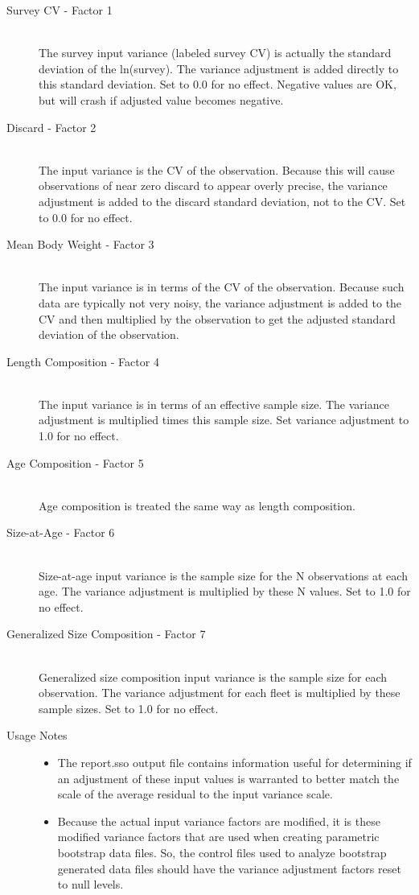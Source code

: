 \begin{description}
	\item[Survey CV - Factor 1]\hfil\\
	The survey input variance (labeled survey CV) is actually the standard deviation of the ln(survey).  The variance adjustment is added directly to this standard deviation.  Set to 0.0 for no effect.  Negative values are OK, but will crash if adjusted value becomes negative.
	\item[Discard - Factor 2]\hfil\\
	The input variance is the CV of the observation.  Because this will cause observations of near zero discard to appear overly precise, the variance adjustment is added to the discard standard deviation, not to the CV.  Set to 0.0 for no effect.
	\item[Mean Body Weight - Factor 3]\hfil\\
	The input variance is in terms of the CV of the observation.  Because such data are typically not very noisy, the variance adjustment is added to the CV and then multiplied by the observation to get the adjusted standard deviation of the observation.
	\item[Length Composition - Factor 4]\hfil\\
	The input variance is in terms of an effective sample size.  The variance adjustment is multiplied times this sample size.  Set variance adjustment to 1.0 for no effect.
	\item[Age Composition - Factor 5]\hfill\\
	Age composition is treated the same way as length composition.
	\item[Size-at-Age - Factor 6]\hfill\\
	Size-at-age input variance is the sample size for the N observations at each age.  The variance adjustment is multiplied by these N values. Set to 1.0 for no effect.
	\item[Generalized Size Composition - Factor 7]\hfill\\
	Generalized size composition input variance is the sample size for each observation.  The variance adjustment for each fleet is multiplied by these sample sizes. Set to 1.0 for no effect.
	\item[Usage Notes]\hfill
	\begin{itemize}
		\item The report.sso output file contains information useful for determining if an adjustment of these input values is warranted to better match the scale of the average residual to the input variance scale.
		\item Because the actual input variance factors are modified, it is these modified variance factors that are used when creating parametric bootstrap data files.  So, the control files used to analyze bootstrap generated data files should have the variance adjustment factors reset to null levels.
	\end{itemize}
\end{description}

